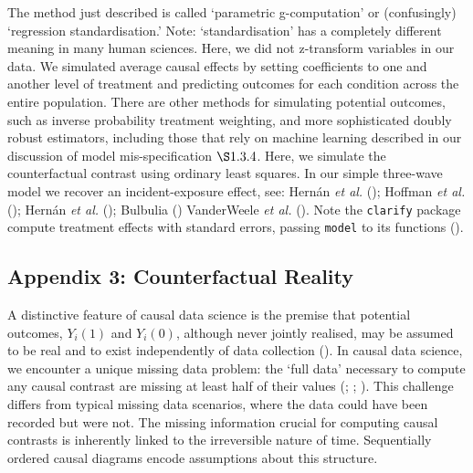 \documentclass[
  singlecolumn]{article}
\begin{document}
The method just described is called `parametric g-computation' or
(confusingly) `regression standardisation.' Note: `standardisation' has
a completely different meaning in many human sciences. Here, we did not
z-transform variables in our data. We simulated average causal effects
by setting coefficients to one and another level of treatment and
predicting outcomes for each condition across the entire population.
There are other methods for simulating potential outcomes, such as
inverse probability treatment weighting, and more sophisticated doubly
robust estimators, including those that rely on machine learning
described in our discussion of model mis-specification \(\S 1.3.4\).
Here, we simulate the counterfactual contrast using ordinary least
squares. In our simple three-wave model we recover an incident-exposure
effect, see: Hernán \emph{et al.}
(); Hoffman \emph{et al.}
(); Hernán \emph{et al.}
(); Bulbulia
() VanderWeele \emph{et al.}
(). Note the \texttt{clarify}
package compute treatment effects with standard errors, passing
\texttt{model} to its functions ().

\newpage{}

\subsection{Appendix 3: Counterfactual
Reality}\label{appendix-3-counterfactual-reality}

A distinctive feature of causal data science is the premise that
potential outcomes, \(Y_i(1)\) and \(Y_i(0)\), although never jointly
realised, may be assumed to be real and to exist independently of data
collection (). In
causal data science, we encounter a unique missing data problem: the
`full data' necessary to compute any causal contrast are missing at
least half of their values (; ;
). This
challenge differs from typical missing data scenarios, where the data
could have been recorded but were not. The missing information crucial
for computing causal contrasts is inherently linked to the irreversible
nature of time. Sequentially ordered causal diagrams encode assumptions
about this structure.
\end{document}
